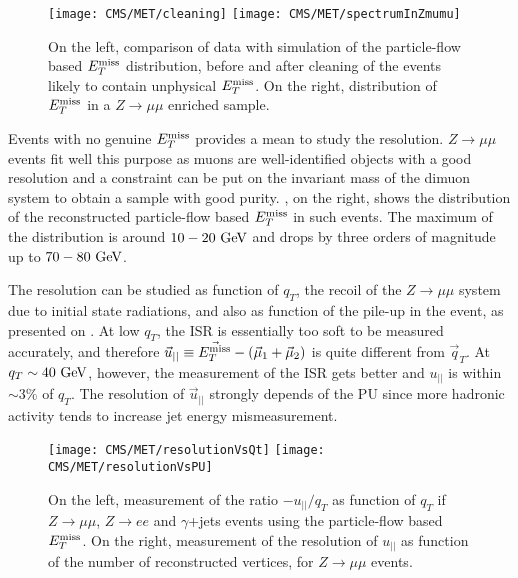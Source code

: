         \begin{figure}[h!]
            \centering
            \texttt{[image: CMS/MET/cleaning]}
            \texttt{[image: CMS/MET/spectrumInZmumu]}
            \caption{On the left, comparison of data with simulation of the
            particle-flow based $E_T^\text{miss}$ distribution, before and after cleaning of the events
            likely to contain unphysical $E_T^\text{miss}$. On the right, distribution of $E_T^\text{miss}$ in
            a $Z \rightarrow \mu\mu$ enriched sample.}
            \label{fig:METspectrum}
        \end{figure}

        Events with no genuine $E_T^\text{miss}$ provides a mean to study the resolution.
        $Z \rightarrow \mu\mu$ events fit well this purpose as muons are well-identified objects
        with a good resolution and a constraint can be put on the invariant mass of the
        dimuon system to obtain a sample with good purity. ,
        on the right, shows the distribution of the reconstructed particle-flow based
        $E_T^\text{miss}$ in such events. The maximum of the distribution is around $10-20~\text{GeV}$ and
        drops by three orders of magnitude up to $70-80~\text{GeV}$.

        The resolution can be studied as function of $q_T$, the recoil of the $Z \rightarrow \mu\mu$
        system due to initial state radiations, and also as function of the pile-up in the
        event, as presented on . At low $q_T$, the ISR is
        essentially too soft to be measured accurately, and therefore $\vec{u}_{||}
        \equiv \vec{E_T^\text{miss}} - (\vec{\mu}_1 + \vec{\mu}_2)$ is quite different from $\vec{q}_T$.
        At $q_T \sim 40~\text{GeV}$, however, the measurement of the ISR gets better and $u_{||}$
        is within $\sim 3\%$ of $q_T$. The resolution of $\vec{u}_{||}$ strongly depends
        of the PU since more hadronic activity tends to increase jet energy mismeasurement.

        \begin{figure}[h!]
            \centering
            \texttt{[image: CMS/MET/resolutionVsQt]}
            \texttt{[image: CMS/MET/resolutionVsPU]}
            \caption{On the left, measurement of the ratio $-u_{||}/q_T$ as function of $q_T$
            if $Z\rightarrow\mu\mu$, $Z\rightarrow e e$ and $\gamma$+jets events using
            the particle-flow based $E_T^\text{miss}$. On the right, measurement of the resolution of
            $u_{||}$ as function of the number of reconstructed vertices, for
            $Z\rightarrow\mu\mu$ events.}
            \label{fig:METresolution}
        \end{figure}


